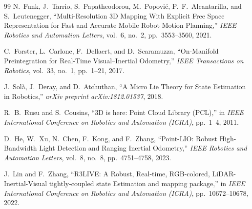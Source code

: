 \documentclass[11pt,a4paper]{report}
\begin{document}
\begin{thebibliography}{99}
N.~Funk, J.~Tarrio, S.~Papatheodorou, M.~Popovi{\'c}, P.~F.~Alcantarilla, and S.~Leutenegger, ``Multi-Resolution 3D Mapping With Explicit Free Space Representation for Fast and Accurate Mobile Robot Motion Planning,'' \textit{IEEE Robotics and Automation Letters}, vol.~6, no.~2, pp.~3553--3560, 2021.

C.~Forster, L.~Carlone, F.~Dellaert, and D.~Scaramuzza, ``On-Manifold Preintegration for Real-Time Visual--Inertial Odometry,'' \textit{IEEE Transactions on Robotics}, vol.~33, no.~1, pp.~1--21, 2017.

J.~Sol{\`a}, J.~Deray, and D.~Atchuthan, ``A Micro Lie Theory for State Estimation in Robotics,'' \textit{arXiv preprint arXiv:1812.01537}, 2018.

R.~B.~Rusu and S.~Cousins, ``3D is here: Point Cloud Library (PCL),'' in \textit{IEEE International Conference on Robotics and Automation (ICRA)}, pp.~1--4, 2011.

D.~He, W.~Xu, N.~Chen, F.~Kong, and F.~Zhang, ``Point-LIO: Robust High-Bandwidth Light Detection and Ranging Inertial Odometry,'' \textit{IEEE Robotics and Automation Letters}, vol.~8, no.~8, pp.~4751--4758, 2023.

J.~Lin and F.~Zhang, ``R3LIVE: A Robust, Real-time, RGB-colored, LiDAR-Inertial-Visual tightly-coupled state Estimation and mapping package,'' in \textit{IEEE International Conference on Robotics and Automation (ICRA)}, pp.~10672--10678, 2022.

\end{thebibliography}
\end{document}

